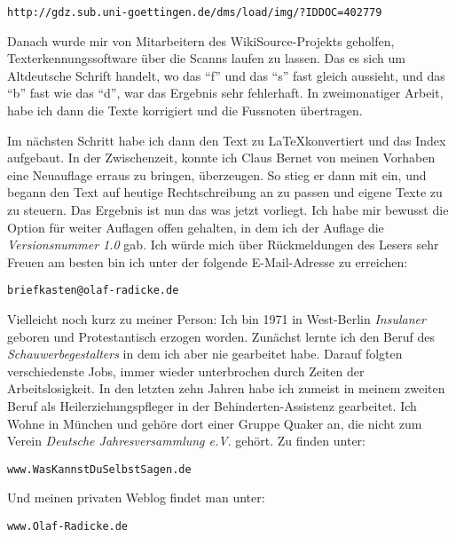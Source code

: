 \begin{center}
\texttt{http://gdz.sub.uni-goettingen.de/dms/load/img/?IDDOC=402779}
\end{center}

Danach wurde mir von Mitarbeitern des WikiSource-Projekts geholfen,
Texterkennungssoftware über die Scanns laufen zu lassen. Das es sich um
Altdeutsche Schrift handelt, wo das "`f"' und das "`s"' fast gleich aussieht,
und das "`b"' fast wie das "`d"', war das Ergebnis sehr fehlerhaft. In
zweimonatiger Arbeit, habe ich dann die Texte korrigiert und die Fussnoten
übertragen.

\medskip

Im nächsten Schritt habe ich dann den Text zu \LaTeX konvertiert und das Index
aufgebaut. In der Zwischenzeit, konnte ich Claus Bernet von meinen Vorhaben eine
Neuauflage erraus zu bringen, überzeugen. So stieg er dann mit ein, und begann
den Text auf heutige Rechtschreibung an zu passen und eigene Texte zu zu
steuern. Das Ergebnis ist nun das was jetzt vorliegt. Ich habe mir bewusst die
Option für weiter Auflagen offen gehalten, in dem ich der Auflage die
\textit{Versionsnummer 1.0} gab. Ich würde mich über Rückmeldungen des Lesers
sehr Freuen am besten bin ich unter der folgende E-Mail-Adresse zu erreichen:

\begin{center}
\texttt{briefkasten@olaf-radicke.de}
\end{center}

Vielleicht noch kurz zu meiner Person: Ich bin 1971 in West-Berlin
\textit{Insulaner} geboren und Protestantisch erzogen worden. Zunächst lernte
ich den Beruf des \textit{Schauwerbegestalters} in dem ich aber nie gearbeitet
habe. Darauf folgten verschiedenste Jobs, immer wieder unterbrochen durch Zeiten
der Arbeitslosigkeit. In den letzten zehn Jahren habe ich zumeist in meinem
zweiten Beruf als Heilerziehungspfleger in der Behinderten-Assistenz gearbeitet.
Ich Wohne in München und gehöre dort einer Gruppe Quaker an, die nicht zum
Verein \textit{Deutsche Jahresversammlung e.V}. gehört. Zu finden unter:

\begin{center}
\texttt{www.WasKannstDuSelbstSagen.de}
\end{center}

Und meinen privaten Weblog findet man unter:

\begin{center}
\texttt{www.Olaf-Radicke.de}
\end{center}

